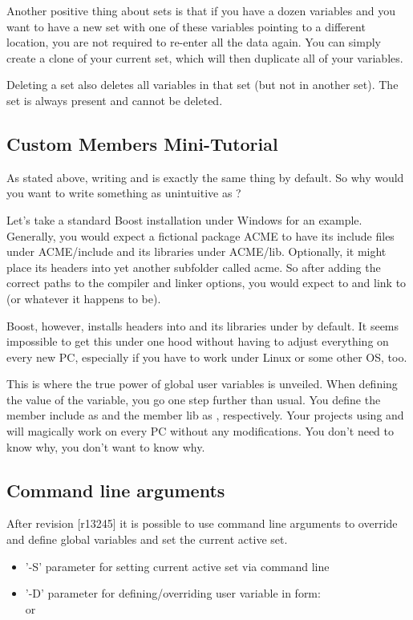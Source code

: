 Another positive thing about sets is that if you have a dozen variables and you want to have a new set with one of these variables pointing to a different location, you are not required to re-enter all the data again. You can simply create a clone of your current set, which will then duplicate all of your variables.

Deleting a set also deletes all variables in that set (but not in another set). The  set is always present and cannot be deleted.

\subsection{Custom Members Mini-Tutorial}\label{sec:mini_tutorial}

As stated above, writing  and  is exactly the same thing by default. So why would you want to write something as unintuitive as ?

Let's take a standard Boost installation under Windows for an example. Generally, you would expect a fictional package ACME to have its include files under ACME/include and its libraries under ACME/lib. Optionally, it might place its headers into yet another subfolder called acme. So after adding the correct paths to the compiler and linker options, you would expect to  and link to  (or whatever it happens to be).

Boost, however, installs headers into  and its libraries under  by default. It seems impossible to get this under one hood without having to adjust everything on every new PC, especially if you have to work under Linux or some other OS, too.

This is where the true power of global user variables is unveiled. When defining the value of the  variable, you go one step further than usual. You define the member include as  and the member lib as , respectively. Your projects using  and  will magically work on every PC without any modifications. You don't need to know why, you don't want to know why.

\subsection{Command line arguments}\label{sec:cmdline_args}
After revision [r13245] it is possible to use command line arguments to override and define global variables and set the current active set.
\begin{itemize}
\item '-S' parameter for setting current active set via command line
\item '-D' parameter for defining/overriding user variable in form:\\
  or 
\end{itemize}